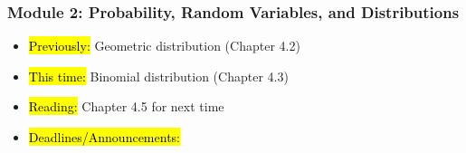 
\begin{frame}
    \frametitle{Module 2: Probability, Random Variables, and Distributions}
    \begin{itemize}
        \item \hl{Previously: } Geometric distribution (Chapter 4.2)
        \item \hl{This time: } Binomial distribution (Chapter 4.3)
        \item \hl{Reading: } Chapter 4.5 for next time
        \item \hl{Deadlines/Announcements: } 
    \end{itemize}
    
\end{frame}
    